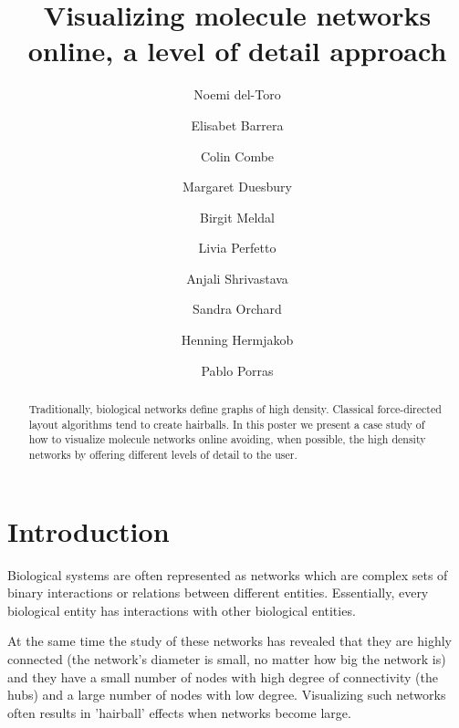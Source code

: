 \documentclass[runningheads]{llncs}
\begin{document}
%
\title{Visualizing molecule networks online, a level of detail approach}
%
%
\author{Noemi del-Toro \and
Elisabet Barrera \and
Colin Combe\and
Margaret Duesbury \and
Birgit Meldal \and
Livia Perfetto \and
Anjali Shrivastava \and
Sandra Orchard \and
Henning Hermjakob \and
Pablo Porras }
%
%
%
\maketitle              %
%
\begin{abstract}
Traditionally, biological networks define graphs of high density. Classical force-directed layout algorithms tend to create hairballs. In this poster we present a case study of how to visualize molecule networks online avoiding, when possible, the high density networks by offering different levels of detail to the user.

\end{abstract}
%
%
%
\section{Introduction}
Biological systems are often represented as networks which are complex sets of binary interactions or relations between different entities. Essentially, every biological entity has interactions with other biological entities.

At the same time the study of these networks has revealed that they are highly connected (the network's diameter is small, no matter how big the network is) and they have a small number of nodes with high degree of connectivity (the hubs) and a large number of nodes with low degree. Visualizing such networks often results in 'hairball' effects when networks become large.
\end{document}
